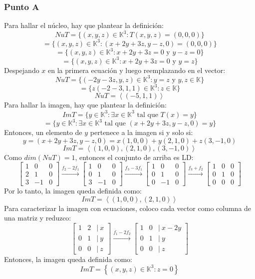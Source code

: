 \documentclass[a4paper,12pt]{article}
\begin{document}
\subsubsection{Punto A}
Para hallar el núcleo, hay que plantear la definición:
$$
NuT = \{ (x,y,z) \in \mathds{K}^3 : T(x,y,z)=(0,0,0) \}
$$
$$
= \{ (x,y,z) \in \mathds{K}^3 : (x+2y+3z,y-z,0)=(0,0,0) \}
$$
$$
= \{ (x,y,z) \in \mathds{K}^3 : x+2y+3z=0 \text{ y } y-z=0 \}
$$
$$
= \{ (x,y,z) \in \mathds{K}^3 : x+2y+3z=0 \text{ y } y=z \}
$$
Despejando $x$ en la primera ecuación y luego reemplazando en el vector:
$$
NuT = \{ (-2y-3z,y,z) \in \mathds{K}^3 : y = z \text { y } y,z \in \mathds{K} \}
$$
$$
= \{ z(-2-3,1,1) \in \mathds{K}^3 : z \in \mathds{K} \}
$$
$$
NuT = \left \langle (-5,1,1) \right \rangle
$$
Para hallar la imagen, hay que plantear la definición:
$$
ImT = \{ y \in \mathds{K}^3 : \exists x \in \mathds{K}^3 \text{ tal que } T(x)=y \}
$$
$$
= \{ y \in \mathds{K}^3 : \exists x \in \mathds{K}^3 \text{ tal que } (x+2y+3z,y-z,0)=y \}
$$
Entonces, un elemento de $y$ pertenece a la imagen si y solo si:
$$
y = (x+2y+3z,y-z,0) = x(1,0,0) + y(2,1,0) + z(3,-1,0)
$$
$$
ImT = \left \langle (1,0,0), (2,1,0), (3,-1,0) \right \rangle
$$
Como $dim(NuT)=1$, entonces el conjunto de arriba es LD:
$$
\begin{bmatrix}
    1 & 0 & 0 \\
    2 & 1 & 0 \\
    3 & -1 & 0
\end{bmatrix}
\xrightarrow[]{f_2-2f_1}
\begin{bmatrix}
    1 & 0 & 0 \\
    0 & 1 & 0 \\
    3 & -1 & 0
\end{bmatrix}
\xrightarrow[]{f_3-3f_1}
\begin{bmatrix}
    1 & 0 & 0 \\
    0 & 1 & 0 \\
    0 & -1 & 0
\end{bmatrix}
\xrightarrow[]{f_3+f_2}
\begin{bmatrix}
    1 & 0 & 0 \\
    0 & 1 & 0 \\
    0 & 0 & 0
\end{bmatrix}
$$
Por lo tanto, la imagen queda definida como:
$$
ImT = \left \langle (1,0,0), (2,1,0) \right \rangle
$$
Para caracterizar la imagen con ecuaciones, coloco cada vector como columna de una matriz y reduzco:
$$
\begin{bmatrix}
    1 & 2 & | \ x \\
    0 & 1 & | \ y \\
    0 & 0 & | \ z
\end{bmatrix}
\xrightarrow[]{f_1-2f_2}
\begin{bmatrix}
    1 & 0 & | \ x-2y \\
    0 & 1 & | \ y \\
    0 & 0 & | \ z
\end{bmatrix}
$$
Entonces, la imagen queda definida como:
$$
ImT = \left \{ (x,y,z) \in \mathds{K}^3 : z = 0 \right \}
$$
\end{document}
